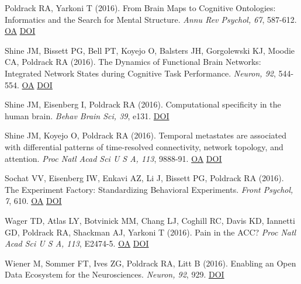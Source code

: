 \documentclass[10pt, letterpaper]{article}
\begin{document}
Poldrack RA, Yarkoni T (2016). From Brain Maps to Cognitive Ontologies: Informatics and the Search for Mental Structure. \textit{Annu Rev Psychol, 67}, 587-612. \href{https://www.ncbi.nlm.nih.gov/pmc/articles/PMC4701616}{OA} \href{http://dx.doi.org/10.1146/annurev-psych-122414-033729}{DOI} \vspace{2mm}

Shine JM, Bissett PG, Bell PT, Koyejo O, Balsters JH, Gorgolewski KJ, Moodie CA, Poldrack RA (2016). The Dynamics of Functional Brain Networks: Integrated Network States during Cognitive Task Performance. \textit{Neuron, 92}, 544-554. \href{https://www.ncbi.nlm.nih.gov/pmc/articles/PMC5073034}{OA} \href{http://dx.doi.org/10.1016/j.neuron.2016.09.018}{DOI} \vspace{2mm}

Shine JM, Eisenberg I, Poldrack RA (2016). Computational specificity in the human brain. \textit{Behav Brain Sci, 39}, e131. \href{http://dx.doi.org/10.1017/s0140525x1500165x}{DOI} \vspace{2mm}

Shine JM, Koyejo O, Poldrack RA (2016). Temporal metastates are associated with differential patterns of time-resolved connectivity, network topology, and attention. \textit{Proc Natl Acad Sci U S A, 113}, 9888-91. \href{https://www.ncbi.nlm.nih.gov/pmc/articles/PMC5024627}{OA} \href{http://dx.doi.org/10.1073/pnas.1604898113}{DOI} \vspace{2mm}

Sochat VV, Eisenberg IW, Enkavi AZ, Li J, Bissett PG, Poldrack RA (2016). The Experiment Factory: Standardizing Behavioral Experiments. \textit{Front Psychol, 7}, 610. \href{https://www.ncbi.nlm.nih.gov/pmc/articles/PMC4844768}{OA} \href{http://dx.doi.org/10.3389/fpsyg.2016.00610}{DOI} \vspace{2mm}

Wager TD, Atlas LY, Botvinick MM, Chang LJ, Coghill RC, Davis KD, Iannetti GD, Poldrack RA, Shackman AJ, Yarkoni T (2016). Pain in the ACC? \textit{Proc Natl Acad Sci U S A, 113}, E2474-5. \href{https://www.ncbi.nlm.nih.gov/pmc/articles/PMC4983860}{OA} \href{http://dx.doi.org/10.1073/pnas.1600282113}{DOI} \vspace{2mm}

Wiener M, Sommer FT, Ives ZG, Poldrack RA, Litt B (2016). Enabling an Open Data Ecosystem for the Neurosciences. \textit{Neuron, 92}, 929. \href{http://dx.doi.org/10.1016/j.neuron.2016.11.009}{DOI} \vspace{2mm}
\end{document}
